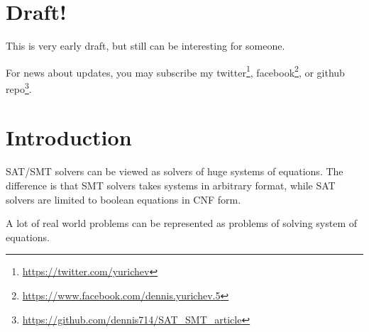 \section{Draft!}

This is very early draft, but still can be interesting for someone.

For news about updates, you may subscribe my 
twitter\footnote{\url{https://twitter.com/yurichev}}, 
facebook\footnote{\url{https://www.facebook.com/dennis.yurichev.5}}, 
or github repo\footnote{\url{https://github.com/dennis714/SAT_SMT_article}}.

\section{Introduction}

\ac{SAT}/\ac{SMT} solvers can be viewed as solvers of huge systems of equations.
The difference is that \ac{SMT} solvers takes systems in arbitrary format,
while \ac{SAT} solvers are limited to boolean equations in CNF form.

A lot of real world problems can be represented as problems of solving system of equations.

